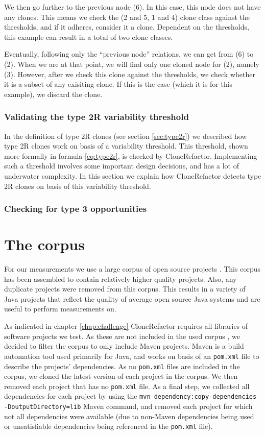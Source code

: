 We then go further to the previous node (6). In this case, this node does not have any clones. This means we check the (2 and 5, 1 and 4) clone class against the thresholds, and if it adheres, consider it a clone. Dependent on the thresholds, this example can result in a total of two clone classes.

Eventually, following only the ``previous node'' relations, we can get from (6) to (2). When we are at that point, we will find only one cloned node for (2), namely (3). However, after we check this clone against the thresholds, we check whether it is a subset of any exisiting clone. If this is the case (which it is for this example), we discard the clone.

\subsubsection{Validating the type 2R variability threshold}
In the definition of type 2R clones (see section \ref{sec:type2r}) we described how type 2R clones work on basis of a variability threshold. This threshold, shown more formally in formula \ref{eq:type2r}, is checked by CloneRefactor. Implementing such a threshold involves some important design decisions, and has a lot of underwater complexity. In this section we explain how CloneRefactor detects type 2R clones on basis of this variability threshold.

\subsubsection{Checking for type 3 opportunities}


\section{The corpus}\label{chap:corpus}
For our measurements we use a large corpus of open source projects \cite{githubCorpus2013}. This corpus has been assembled to contain relatively higher quality projects. Also, any duplicate projects were removed from this corpus. This results in a variety of Java projects that reflect the quality of average open source Java systems and are useful to perform measurements on.

As indicated in chapter \ref{chap:challenge} CloneRefactor requires all libraries of software projects we test. As these are not included in the used corpus \cite{githubCorpus2013}, we decided to filter the corpus to only include Maven projects. Maven is a build automation tool used primarily for Java, and works on basis of an \texttt{pom.xml} file to describe the projects' dependencies. As no \texttt{pom.xml} files are included in the corpus, we cloned the latest version of each project in the corpus. We then removed each project that has no \texttt{pom.xml} file. As a final step, we collected all dependencies for each project by using the \texttt{mvn dependency:copy-dependencies -DoutputDirectory=lib} Maven command, and removed each project for which not all dependencies were available (due to non-Maven dependencies being used or unsatisfiable dependencies being referenced in the \texttt{pom.xml} file).

